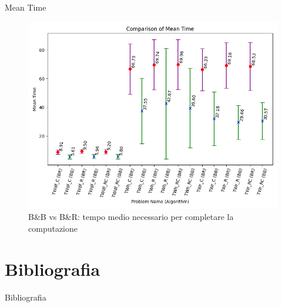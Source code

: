\documentclass[10pt]{beamer}
\begin{document}
    \begin{frame}{Mean Time}
        \begin{figure}[h!]
            \centering
            \includegraphics[width=1.0\textwidth]{Images/mean_time.png}
            \caption{B\&B vs B\&R: tempo medio necessario per completare la computazione}
            \label{fig:mean_time}
        \end{figure}
    \end{frame}
    
    \section{Bibliografia}
    \begin{frame}[allowframebreaks]{Bibliografia}
        \printbibliography[heading=none]
    \end{frame}
    
\end{document}
